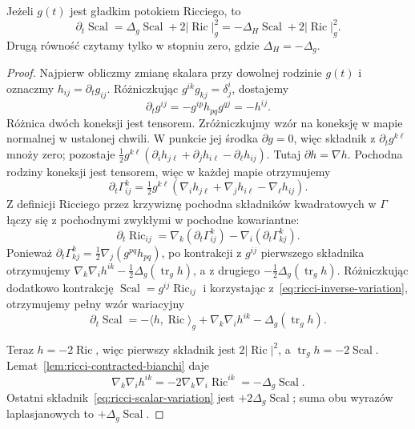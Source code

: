 \begin{twierdzenie}
\label{thm:ricci-scalar-evolution}
Jeżeli $g(t)$ jest gładkim potokiem Ricciego, to
\begin{equation}\label{eq:ricci-scalar-evolution}
 \partial_t\operatorname{Scal}
 =\Delta_g\operatorname{Scal}
  +2|\operatorname{Ric}|_g^2
 =-\Delta_H\operatorname{Scal}
  +2|\operatorname{Ric}|_g^2.
\end{equation}
Drugą równość czytamy tylko w stopniu zero, gdzie
$\Delta_H=-\Delta_g$.
\end{twierdzenie}
\begin{proof}
Najpierw obliczmy zmianę skalara przy dowolnej
rodzinie $g(t)$ i oznaczmy $h_{ij}=\partial_tg_{ij}$.
Różniczkując $g^{ik}g_{kj}=\delta^i_j$, dostajemy
\begin{equation}\label{eq:ricci-inverse-variation}
 \partial_tg^{ij}=-g^{ip}h_{pq}g^{qj}=-h^{ij}.
\end{equation}
Różnica dwóch koneksji jest tensorem. Zróżniczkujmy wzór
na koneksję w mapie normalnej w ustalonej chwili. W punkcie
jej środka $\partial g=0$, więc składnik z $\partial_tg^{k\ell}$
mnoży zero; pozostaje
$\tfrac12g^{k\ell}(\partial_i h_{j\ell}
+\partial_j h_{i\ell}-\partial_\ell h_{ij})$.
Tutaj $\partial h=\nabla h$. Pochodna rodziny koneksji
jest tensorem, więc w każdej mapie otrzymujemy
\begin{equation}\label{eq:ricci-connection-variation}
 \partial_t\Gamma^k_{ij}
 =\tfrac12g^{k\ell}
   (\nabla_i h_{j\ell}+\nabla_j h_{i\ell}
                        -\nabla_\ell h_{ij}).
\end{equation}
Z definicji Ricciego przez krzywiznę pochodna
składników kwadratowych w $\Gamma$ łączy się
z pochodnymi zwykłymi w pochodne kowariantne:
\[
 \partial_t\operatorname{Ric}_{ij}
 =\nabla_k(\partial_t\Gamma^k_{ij})
   -\nabla_i(\partial_t\Gamma^k_{kj}).
\]
Ponieważ $\partial_t\Gamma^k_{kj}
=\tfrac12\nabla_j(g^{pq}h_{pq})$, po kontrakcji
z $g^{ij}$ pierwszego składnika otrzymujemy
$\nabla_k\nabla_i h^{ik}
-\tfrac12\Delta_g(\operatorname{tr}_gh)$,
a z drugiego
$-\tfrac12\Delta_g(\operatorname{tr}_gh)$.
Różniczkując dodatkowo kontrakcję
$\operatorname{Scal}=g^{ij}\operatorname{Ric}_{ij}$
i korzystając z~\eqref{eq:ricci-inverse-variation},
otrzymujemy pełny wzór wariacyjny
\begin{equation}\label{eq:ricci-scalar-variation}
 \partial_t\operatorname{Scal}
 =-\langle h,\operatorname{Ric}\rangle_g
   +\nabla_k\nabla_i h^{ik}
   -\Delta_g(\operatorname{tr}_g h).
\end{equation}

Teraz $h=-2\operatorname{Ric}$, więc pierwszy składnik
jest $2|\operatorname{Ric}|^2$, a
$\operatorname{tr}_gh=-2\operatorname{Scal}$.
Lemat~\ref{lem:ricci-contracted-bianchi} daje
\[
 \nabla_k\nabla_i h^{ik}
 =-2\nabla_k\nabla_i\operatorname{Ric}^{ik}
 =-\Delta_g\operatorname{Scal}.
\]
Ostatni składnik~\eqref{eq:ricci-scalar-variation}
jest $+2\Delta_g\operatorname{Scal}$; suma obu
wyrazów laplasjanowych to $+\Delta_g\operatorname{Scal}$.
\end{proof}

